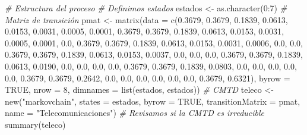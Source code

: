\documentclass[
]{book}
\newenvironment{Shaded}{\begin{snugshade}}{\end{snugshade}}
\newcommand{\AttributeTok}[1]{\textcolor[rgb]{0.77,0.63,0.00}{#1}}
\newcommand{\CommentTok}[1]{\textcolor[rgb]{0.56,0.35,0.01}{\textit{#1}}}
\newcommand{\ConstantTok}[1]{\textcolor[rgb]{0.00,0.00,0.00}{#1}}
\newcommand{\DecValTok}[1]{\textcolor[rgb]{0.00,0.00,0.81}{#1}}
\newcommand{\FloatTok}[1]{\textcolor[rgb]{0.00,0.00,0.81}{#1}}
\newcommand{\FunctionTok}[1]{\textcolor[rgb]{0.00,0.00,0.00}{#1}}
\newcommand{\NormalTok}[1]{#1}
\newcommand{\OtherTok}[1]{\textcolor[rgb]{0.56,0.35,0.01}{#1}}
\newcommand{\SpecialCharTok}[1]{\textcolor[rgb]{0.00,0.00,0.00}{#1}}
\newcommand{\StringTok}[1]{\textcolor[rgb]{0.31,0.60,0.02}{#1}}
\theoremstyle{definition}
\theoremstyle{definition}
\theoremstyle{definition}
\theoremstyle{definition}
\theoremstyle{remark}
\begin{document}
\begin{Shaded}
\begin{Highlighting}[]
\CommentTok{\# Estructura del proceso}
\CommentTok{\# Definimos estados}
\NormalTok{estados }\OtherTok{\textless{}{-}} \FunctionTok{as.character}\NormalTok{(}\DecValTok{0}\SpecialCharTok{:}\DecValTok{7}\NormalTok{)}
\CommentTok{\# Matriz de transición }
\NormalTok{pmat }\OtherTok{\textless{}{-}} \FunctionTok{matrix}\NormalTok{(}\AttributeTok{data =} \FunctionTok{c}\NormalTok{(}\FloatTok{0.3679}\NormalTok{, }\FloatTok{0.3679}\NormalTok{, }\FloatTok{0.1839}\NormalTok{, }\FloatTok{0.0613}\NormalTok{, }\FloatTok{0.0153}\NormalTok{, }
                        \FloatTok{0.0031}\NormalTok{, }\FloatTok{0.0005}\NormalTok{, }\FloatTok{0.0001}\NormalTok{,}
\FloatTok{0.3679}\NormalTok{, }\FloatTok{0.3679}\NormalTok{, }\FloatTok{0.1839}\NormalTok{, }\FloatTok{0.0613}\NormalTok{, }\FloatTok{0.0153}\NormalTok{, }\FloatTok{0.0031}\NormalTok{, }\FloatTok{0.0005}\NormalTok{, }\FloatTok{0.0001}\NormalTok{,}
\FloatTok{0.0}\NormalTok{, }\FloatTok{0.3679}\NormalTok{, }\FloatTok{0.3679}\NormalTok{, }\FloatTok{0.1839}\NormalTok{, }\FloatTok{0.0613}\NormalTok{, }\FloatTok{0.0153}\NormalTok{, }\FloatTok{0.0031}\NormalTok{, }\FloatTok{0.0006}\NormalTok{,}
\FloatTok{0.0}\NormalTok{, }\FloatTok{0.0}\NormalTok{, }\FloatTok{0.3679}\NormalTok{, }\FloatTok{0.3679}\NormalTok{, }\FloatTok{0.1839}\NormalTok{, }\FloatTok{0.0613}\NormalTok{, }\FloatTok{0.0153}\NormalTok{, }\FloatTok{0.0037}\NormalTok{,}
\FloatTok{0.0}\NormalTok{, }\FloatTok{0.0}\NormalTok{, }\FloatTok{0.0}\NormalTok{, }\FloatTok{0.3679}\NormalTok{, }\FloatTok{0.3679}\NormalTok{, }\FloatTok{0.1839}\NormalTok{, }\FloatTok{0.0613}\NormalTok{, }\FloatTok{0.0190}\NormalTok{,}
\FloatTok{0.0}\NormalTok{, }\FloatTok{0.0}\NormalTok{, }\FloatTok{0.0}\NormalTok{, }\FloatTok{0.0}\NormalTok{, }\FloatTok{0.3679}\NormalTok{, }\FloatTok{0.3679}\NormalTok{, }\FloatTok{0.1839}\NormalTok{, }\FloatTok{0.0803}\NormalTok{,}
\FloatTok{0.0}\NormalTok{, }\FloatTok{0.0}\NormalTok{, }\FloatTok{0.0}\NormalTok{, }\FloatTok{0.0}\NormalTok{, }\FloatTok{0.0}\NormalTok{, }\FloatTok{0.3679}\NormalTok{, }\FloatTok{0.3679}\NormalTok{, }\FloatTok{0.2642}\NormalTok{,}
\FloatTok{0.0}\NormalTok{, }\FloatTok{0.0}\NormalTok{, }\FloatTok{0.0}\NormalTok{, }\FloatTok{0.0}\NormalTok{, }\FloatTok{0.0}\NormalTok{, }\FloatTok{0.0}\NormalTok{, }\FloatTok{0.3679}\NormalTok{, }\FloatTok{0.6321}\NormalTok{), }
               \AttributeTok{byrow =} \ConstantTok{TRUE}\NormalTok{, }\AttributeTok{nrow =} \DecValTok{8}\NormalTok{, }
               \AttributeTok{dimnames =} \FunctionTok{list}\NormalTok{(estados, estados))}
\CommentTok{\# CMTD}
\NormalTok{teleco }\OtherTok{\textless{}{-}} \FunctionTok{new}\NormalTok{(}\StringTok{"markovchain"}\NormalTok{, }\AttributeTok{states =}\NormalTok{ estados, }
                 \AttributeTok{byrow =} \ConstantTok{TRUE}\NormalTok{, }\AttributeTok{transitionMatrix =}\NormalTok{ pmat, }
              \AttributeTok{name =} \StringTok{"Telecomunicaciones"}\NormalTok{)}
\CommentTok{\# Revisamos si la CMTD es irreducible}
\FunctionTok{summary}\NormalTok{(teleco)}
\end{Highlighting}
\end{Shaded}
\end{document}
